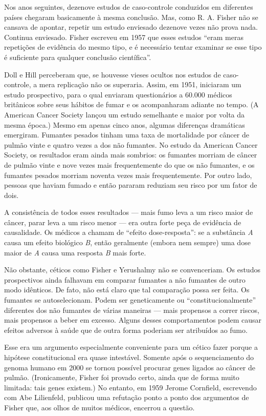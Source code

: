 \documentclass[11pt,a5paper,twoside]{book}
\begin{document}
Nos anos seguintes, dezenove estudos de caso-controle conduzidos em diferentes países chegaram basicamente à mesma conclusão. Mas, como R. A. Fisher não se cansava de apontar, repetir um estudo enviesado dezenove vezes não prova nada. Continua enviesado. Fisher escreveu em 1957 que esses estudos “eram meras repetições de evidência do mesmo tipo, e é necessário tentar examinar se esse tipo é suficiente para qualquer conclusão científica”.

Doll e Hill perceberam que, se houvesse vieses ocultos nos estudos de caso-controle, a mera replicação não os superaria. Assim, em 1951, iniciaram um estudo prospectivo, para o qual enviaram questionários a 60.000 médicos britânicos sobre seus hábitos de fumar e os acompanharam adiante no tempo. (A American Cancer Society lançou um estudo semelhante e maior por volta da mesma época.) Mesmo em apenas cinco anos, algumas diferenças dramáticas emergiram. Fumantes pesados tinham uma taxa de mortalidade por câncer de pulmão vinte e quatro vezes a dos não fumantes. No estudo da American Cancer Society, os resultados eram ainda mais sombrios: os fumantes morriam de câncer de pulmão vinte e nove vezes mais frequentemente do que os não fumantes, e os fumantes pesados morriam noventa vezes mais frequentemente. Por outro lado, pessoas que haviam fumado e então pararam reduziam seu risco por um fator de dois.

A consistência de todos esses resultados — mais fumo leva a um risco maior de câncer, parar leva a um risco menor — era outra forte peça de evidência de causalidade. Os médicos a chamam de “efeito dose-resposta”: se a substância \textit{A} causa um efeito biológico \textit{B}, então geralmente (embora nem sempre) uma dose maior de \textit{A} causa uma resposta \textit{B} mais forte.

Não obstante, céticos como Fisher e Yerushalmy não se convenceriam. Os estudos prospectivos ainda falhavam em comparar fumantes a não fumantes de outro modo idênticos. De fato, não está claro que tal comparação possa ser feita. Os fumantes se autoselecionam. Podem ser geneticamente ou “constitucionalmente” diferentes dos não fumantes de várias maneiras — mais propensos a correr riscos, mais propensos a beber em excesso. Alguns desses comportamentos podem causar efeitos adversos à saúde que de outra forma poderiam ser atribuídos ao fumo.

Esse era um argumento especialmente conveniente para um cético fazer porque a hipótese constitucional era quase intestável. Somente após o sequenciamento do genoma humano em 2000 se tornou possível procurar genes ligados ao câncer de pulmão. (Ironicamente, Fisher foi provado certo, ainda que de forma muito limitada: tais genes existem.) No entanto, em 1959 Jerome Cornfield, escrevendo com Abe Lilienfeld, publicou uma refutação ponto a ponto dos argumentos de Fisher que, aos olhos de muitos médicos, encerrou a questão.
\end{document}
